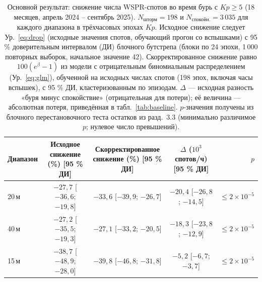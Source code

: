 \documentclass{agujournal2019}
\begin{document}
\begin{table}[h]
	\centering
	\footnotesize
	\setlength{\tabcolsep}{3pt}
	\caption{Основной результат: снижение числа WSPR-спотов во время бурь
		с $Kp \ge 5$ (18 месяцев, апрель 2024 -- сентябрь 2025).
		$N_{\mbox{шторм}} = 198$ и $N_{\mbox{спокойн.}} = 3\,035$ для каждого
		диапазона в трёхчасовых эпохах $Kp$. Исходное снижение следует
		Ур.~\eqref{eq:drop} (исходные значения спотов, обучающий прогон со вспышками) с 95 \%
		доверительным интервалом (ДИ) блочного бутстрепа (блоки по
		24 эпохи, 1\,000 повторных выборок, начальное значение 42). Скорректированное снижение
		равно $100(e^{\beta}-1)$ из модели с отрицательным биномиальным
		распределением (Ур.~\eqref{eq:glm}), обученной на исходных числах
		спотов (198 эпох, включая часы вспышек), с 95 \% ДИ,
		кластеризованным по эпизодам. $\Delta$ — исходная разность
		«буря минус спокойствие» (отрицательная для потери); её величина —
		абсолютная потеря, приведённая в табл.~\ref{tab:baseline}.
		$p$-значения получены из блочного перестановочного теста остатков
		из разд.~3.3 (минимально различимое $p$; нулевое число
		превышений).}
	\label{tab:main}
	\begin{tabular}{lcccr}
		\toprule
		Диапазон
		& \shortstack[b]{Исходное снижение\\ (\%) [95 \% ДИ]}
		& \shortstack[b]{Скорректированное\\ снижение (\%) [95 \% ДИ]}
		& \shortstack[b]{$\Delta$ ($10^3$ спотов/ч)\\ {}[95 \% ДИ]}
		& $p$ \\
		\midrule
		20\,м
		& $-27{,}7$ [$-36{,}6$; $-19{,}8$]
		& $-33{,}6$ [$-39{,}9$; $-26{,}7$]
		& $-20{,}4$ [$-26{,}8$; $-14{,}5$] & $\le 2\times10^{-5}$ \\
		40\,м
		& $-27{,}2$ [$-35{,}5$; $-19{,}3$]
		& $-27{,}1$ [$-33{,}2$; $-20{,}5$]
		& $-18{,}3$ [$-23{,}8$; $-12{,}9$] & $\le 2\times10^{-5}$ \\
		15\,м
		& $-38{,}7$ [$-48{,}9$; $-28{,}0$]
		& $-39{,}8$ [$-46{,}8$; $-31{,}8$]
		& $-5{,}2$ [$-6{,}7$; $-3{,}7$] & $\le 2\times10^{-5}$ \\
		\bottomrule
	\end{tabular}
\end{table}
\end{document}

